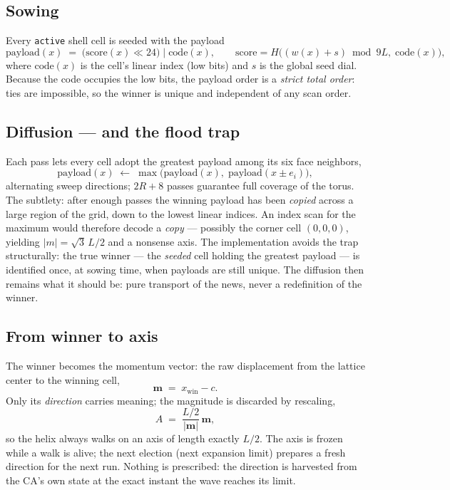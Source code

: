 \documentclass[11pt,a4paper]{article}
\begin{document}
\subsection{Sowing}
Every \texttt{active} shell cell is seeded with the payload
\begin{equation}
\mathrm{payload}(x) \;=\; \bigl(\mathrm{score}(x) \ll 24\bigr)\;\big|\;\mathrm{code}(x),
\qquad
\mathrm{score} = H\bigl((w(x) + s) \bmod 9L,\; \mathrm{code}(x)\bigr),
\end{equation}
where $\mathrm{code}(x)$ is the cell's linear index (low bits) and $s$
is the global seed dial. Because the code occupies the low bits, the
payload order is a \emph{strict total order}: ties are impossible, so
the winner is unique and independent of any scan order.

\subsection{Diffusion --- and the flood trap}
Each pass lets every cell adopt the greatest payload among its six face
neighbors,
\begin{equation}
\mathrm{payload}(x) \;\leftarrow\; \max\bigl(\mathrm{payload}(x),\;
\mathrm{payload}(x \pm e_i)\bigr),
\end{equation}
alternating sweep directions; $2R + 8$ passes guarantee full coverage of
the torus. The subtlety: after enough passes the winning payload has been
\emph{copied} across a large region of the grid, down to the lowest
linear indices. An index scan for the maximum would therefore decode a
\emph{copy} --- possibly the corner cell $(0,0,0)$, yielding
$|m| = \sqrt{3}\,L/2$ and a nonsense axis. The implementation avoids the
trap structurally: the true winner --- the \emph{seeded} cell holding the
greatest payload --- is identified once, at sowing time, when payloads
are still unique. The diffusion then remains what it should be: pure
transport of the news, never a redefinition of the winner.

\subsection{From winner to axis}
The winner becomes the momentum vector: the raw displacement from the
lattice center to the winning cell,
\begin{equation}
\boldsymbol{m} \;=\; x_{\mathrm{win}} - c .
\end{equation}
Only its \emph{direction} carries meaning; the magnitude is discarded by
rescaling,
\begin{equation}
A \;=\; \frac{L/2}{|\boldsymbol{m}|}\,\boldsymbol{m},
\end{equation}
so the helix always walks on an axis of length exactly $L/2$. The axis is
frozen while a walk is alive; the next election (next expansion limit)
prepares a fresh direction for the next run. Nothing is prescribed: the
direction is harvested from the CA's own state at the exact instant the
wave reaches its limit.
\end{document}
